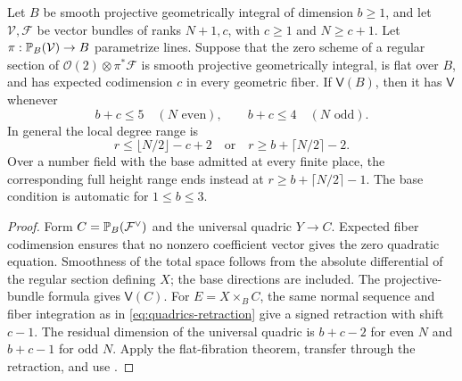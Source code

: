 \begin{theorem}\label{thm:relative-quadrics}
Let $B$ be smooth projective geometrically integral of dimension
$b\geq1$, and let $\mathcal V,\mathcal F$ be vector bundles of
ranks $N+1,c$, with $c\geq1$ and $N\geq c+1$.
Let $\pi:\mathbb P_B(\mathcal V)\to B$ parametrize lines. Suppose that
the zero scheme of a regular section of
$\mathcal O(2)\otimes\pi^*\mathcal F$ is smooth projective
geometrically integral, is flat over $B$, and has expected
codimension $c$ in every geometric fiber. If $\mathsf V(B)$,
then it has $\mathsf V$ whenever
\[
 b+c\leq5\quad(N\text{ even}),\qquad
 b+c\leq4\quad(N\text{ odd}).
\]
In general the local degree range is
\[
 r\leq\lfloor N/2\rfloor-c+2
 \quad\text{or}\quad r\geq b+\lceil N/2\rceil-2.
\]
Over a number field with the base admitted at every finite place,
the corresponding full height range ends instead at
$r\geq b+\lceil N/2\rceil-1$. The base condition is automatic
for $1\leq b\leq3$.
\end{theorem}

\begin{proof}
Form $C=\mathbb P_B(\mathcal F^\vee)$ and the universal quadric
$Y\to C$. Expected fiber codimension ensures that no nonzero
coefficient vector gives the zero quadratic equation. Smoothness
of the total space follows from the absolute differential of the
regular section defining $X$; the base directions are included.
The projective-bundle formula gives $\mathsf V(C)$. For
$E=X\times_BC$, the same normal sequence and fiber integration
as in \eqref{eq:quadrics-retraction} give a signed retraction with
shift $c-1$. The residual dimension of the universal quadric is
$b+c-2$ for even $N$ and $b+c-1$ for odd $N$. Apply the
flat-fibration theorem, transfer through the retraction, and use
.
\end{proof}
